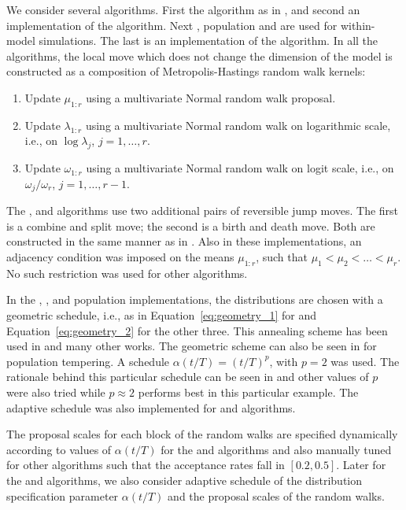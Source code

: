 We consider several algorithms. First the \rjmcmc algorithm as in \cite{Richardson:1997ea}, and second an implementation of the \smc[1] algorithm. Next \ais, population \mcmc and \smc[2] are used for within-model simulations. The last is an implementation of the \smc[3] algorithm. In all the algorithms, the local move which does not change the dimension of the model is constructed as a composition of Metropolis-Hastings random walk kernels:
\begin{enumerate}
  \item Update $\mu_{1:r}$ using a multivariate Normal random walk proposal.
  \item Update $\lambda_{1:r}$ using a multivariate Normal random walk on logarithmic scale, i.e., on $\log\lambda_{j}$, $j = 1, \dots, r$.
  \item Update $\omega_{1:r}$ using a multivariate Normal random walk on logit scale, i.e., on $\omega_{j}/\omega_r$, $j = 1,\dots,r-1$.
\end{enumerate}
The \rjmcmc, \smc[1] and \smc[3] algorithms use two additional pairs of reversible jump moves. The first is a combine and split move; the second is a birth and death move. Both are constructed in the same manner as in \cite{Richardson:1997ea}. Also in these implementations, an adjacency condition was imposed on the means $\mu_{1:r}$, such that $\mu_1 < \mu_2 < \dots < \mu_r$. No such restriction was used for other algorithms.

In the \smc[1], \smc[2], \ais and population \mcmc implementations, the distributions are chosen with a geometric schedule, i.e., as in Equation~\eqref{eq:geometry_1} for \smc[1] and Equation~\eqref{eq:geometry_2} for the other three. This annealing scheme has been used in \cite{DelMoral:2006hc,Jasra:2007in} and many other works. The geometric scheme can also be seen in \cite{Calderhead:2009bd} for population \mcmc tempering. A schedule $\alpha(t/T) = (t/T)^p$, with $p = 2$ was used. The rationale behind this particular schedule can be seen in \cite{Calderhead:2009bd} and other values of $p$ were also tried while $p\approx2$ performs best in this particular example. The adaptive schedule was also implemented for \smc[2] and \ais algorithms.

The proposal scales for each block of the random walks are specified dynamically according to values of $\alpha(t/T)$ for the \smc[2] and \ais algorithms and also manually tuned for other algorithms such that the acceptance rates fall in $[0.2, 0.5]$. Later for the \smc[2] and \ais algorithms, we also consider adaptive schedule of the distribution specification parameter $\alpha(t/T)$ and the proposal scales of the random walks.

